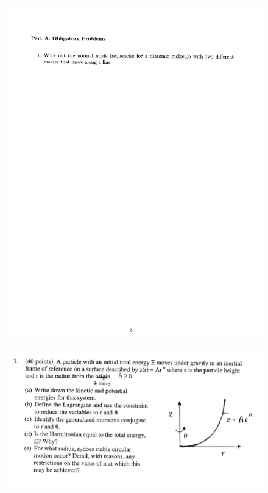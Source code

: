 \documentclass[10pt,a4paper]{article}
\begin{document}
\begin{figure}[H]
 \centering
 \includegraphics[width=16cm]{pdf/1-1T39.png}
\end{figure}
 \newpage
\begin{figure}[H]
 \centering
 \includegraphics[width=16cm]{pdf/1-1T3.png}
\end{figure}
 \newpage
\end{document}
